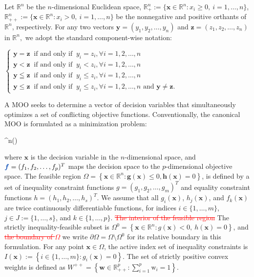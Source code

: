\documentclass[11pt,pdflatex,sn-mathphys-ay]{sn-jnl}%
\theoremstyle{definition}
\theoremstyle{thmstyleone}%
\theoremstyle{thmstyletwo}%
\theoremstyle{thmstylethree}%
\newcommand{\bb}[1]{\mathbf{#1}}
\newcounter{cases}
\newcommand{\del}[1]{\textcolor{red}{\sout{#1}}}
\newcommand{\add}[1]{\textcolor{revisionblue}{#1}}
\begin{document}
	Let $\mathbb{R}^n$ be the $n$-dimensional Euclidean space, $\mathbb{R}^n_+ := \{ \bm{x} \in \mathbb{R}^n : x_i \ge 0, ~ i=1,\ldots,n \}$, $\mathbb{R}^n_{++} := \{ \bm{x} \in \mathbb{R}^n : x_i > 0, ~ i=1,\ldots,n \}$
	be the nonnegative and positive orthants of $\mathbb{R}^n$, respectively. 
	For any two vectors $\bm{y}=(y_1, y_2, \dots, y_n)$ and $\bm{z}=(z_1, z_2, \dots, z_n)$ in
	$\mathbb{R}^n,$ we adopt the standard component-wise notation: 
	\begin{center}
		$
		\begin{cases}
			\bm{y} = \bm{z} ~\text{ if and only if }~ y_i=z_i, \forall i=1, 2, \dots, n\\
			\bm{y} < \bm{z} ~\text{ if and only if }~  y_i<z_i, \forall i=1, 2, \dots, n\\
			\bm{y} \leqq \bm{z} ~\text{ if and only if }~  y_i \leq z_i, \forall i=1, 2, \dots, n\\
			\bm{y} \leq \bm{z} ~\text{ if and only if }~  y_i\leq z_i, \forall i=1, 2, \dots, n \text{ and } \bm{y}\neq \bm{z}.
		\end{cases}
		$
	\end{center}
	A MOO seeks to determine a vector of decision variables that simultaneously optimizes a set of conflicting objective functions. Conventionally, the canonical MOO is formulated as a minimization problem:
	\begin{mini!}{ \in {}^n}{()}{}{}\nonumber
		\nonumber
	\end{mini!}
	\noindent  where $\bm{x}$ is the decision variable in the $n$-dimensional space, and $\add{\bm{f}} =(f_1, f_2, \dots, f_p)^T $ maps the decision space to the $p$-dimensional objective space. The feasible region $\Omega = \left\{ \bm{x} \in \mathbb{R}^n : \bm{g}(\bm{x}) \leq 0, \bm{h}(\bm{x}) = 0 \right\}$, is defined by a set of inequality constraint functions $g=(g_1, g_2, \dots, g_m)^T$ and equality constraint functions $h=(h_1,h_2,\dots,h_s)^T$. We assume that all \( g_i(\bm{x}) \), \( h_j(\bm{x}) \), and \( f_k(\bm{x}) \) are twice continuously differentiable functions, for indices \( i \in \{1, \ldots, m\} \),  \( j \in J:=\{1, \ldots, s\} \), and \( k \in \{1, \ldots, p\} \). \del{The interior of the feasible region} \add{The strictly inequality-feasible subset} is $\Omega^0 = \left\{ \bm{x} \in \mathbb{R}^n : g(\bm{x}) < 0, \ h(\bm{x}) = 0 \right\}$, and \del{the boundary of $\Omega$ } \add{we write $\partial\Omega=\Omega\setminus\Omega^0$
		for its relative boundary in this formulation.} 
	For any point $\bm{x}\in\Omega$, the active index set of inequality constraints is $I(\bm{x}) := \left\{ i \in \{1, \ldots, m\} : g_i(\bm{x}) = 0 \right\}.$ The set of strictly positive convex weights is defined as $W^{++} = \left\{ \bb{w} \in \mathbb{R}_{++}^p : \sum\limits_{i=1}^p \text{w}_i = 1 \right\}$. 
	
\end{document}
